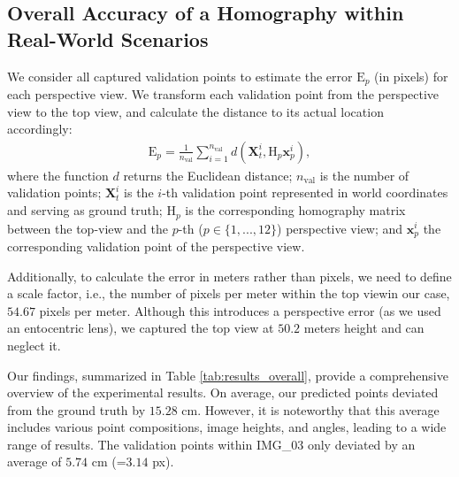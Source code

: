 \subsection{Overall Accuracy of a Homography within Real-World Scenarios}
We consider all captured validation points to estimate the error 
$\mathrm{E}_p$ (in pixels) for each perspective view. We transform 
each validation point from the perspective view to the top view, 
and calculate the distance to its actual location accordingly:
\begin{equation}
\begin{aligned}
\mathrm{E}_{p} = \frac{1}{n_\text{val}} \sum_{i=1}^{n_\text{val}}{d(\mathbf{X}_{t}^{i}, \mathrm{H}_p\mathbf{x}_{p}^i)},
\end{aligned}
\end{equation}
where the function $d$ returns the Euclidean distance; $n_\text{val}$ is the number of 
validation points; $\mathbf{X}^{i}_{t}$ 
is the $i$-th validation point represented in world coordinates and serving as
ground truth; $\mathrm{H}_p$ is the corresponding homography matrix between 
the top-view and the $p$-th ($p \in \{ 1, ..., 12 \}$) perspective view; 
and $\mathbf{x}_{p}^i$ the corresponding validation point of the 
perspective view. 

Additionally, to calculate the error in meters rather than pixels, we need 
to define a scale factor, i.e., the number of pixels per meter within 
the top view\textemdash in 
our case, $54.67$ pixels per meter. Although this introduces a perspective error 
(as we used an entocentric lens), we captured the top view at $50.2$ meters height 
and can neglect it. 

Our findings, summarized in Table \ref{tab:results_overall}, provide a 
comprehensive overview of the experimental results. On average, our predicted 
points deviated from the ground truth by $15.28$ cm. However, it is 
noteworthy that this average includes various point compositions, 
image heights, and angles, leading to a wide range of results. 
The validation points within IMG\_03 only deviated by an average of 
$5.74$ cm (=$3.14$ px).

